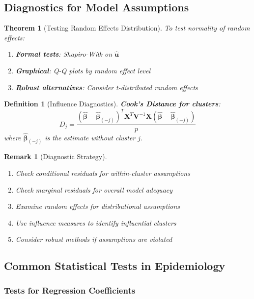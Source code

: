 \documentclass{article}
\newtheorem{definition}{Definition}
\newtheorem{theorem}{Theorem}
\newtheorem{remark}{Remark}
\begin{document}
\subsection{Diagnostics for Model Assumptions}

\begin{theorem}[Testing Random Effects Distribution]
To test normality of random effects:
\begin{enumerate}
    \item \textbf{Formal tests}: Shapiro-Wilk on $\hat{\mathbf{u}}$
    \item \textbf{Graphical}: Q-Q plots by random effect level
    \item \textbf{Robust alternatives}: Consider t-distributed random effects
\end{enumerate}
\end{theorem}

\begin{definition}[Influence Diagnostics]
\textbf{Cook's Distance for clusters}:
\begin{equation}
D_j = \frac{(\hat{\boldsymbol{\beta}} - \hat{\boldsymbol{\beta}}_{(-j)})^T\mathbf{X}^T\mathbf{V}^{-1}\mathbf{X}(\hat{\boldsymbol{\beta}} - \hat{\boldsymbol{\beta}}_{(-j)})}{p}
\end{equation}
where $\hat{\boldsymbol{\beta}}_{(-j)}$ is the estimate without cluster $j$.
\end{definition}

\begin{remark}[Diagnostic Strategy]
\begin{enumerate}
    \item Check conditional residuals for within-cluster assumptions
    \item Check marginal residuals for overall model adequacy
    \item Examine random effects for distributional assumptions
    \item Use influence measures to identify influential clusters
    \item Consider robust methods if assumptions are violated
\end{enumerate}
\end{remark}

\subsection{Common Statistical Tests in Epidemiology}

\subsubsection{Tests for Regression Coefficients}
\end{document}
